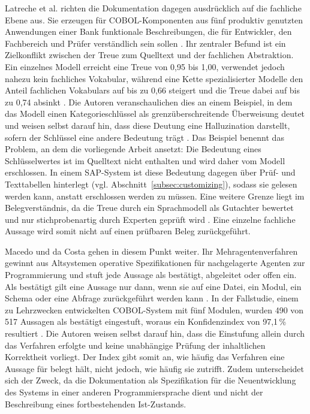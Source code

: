 Latreche et al. richten die Dokumentation dagegen ausdrücklich auf die fachliche Ebene aus. Sie erzeugen für COBOL-Komponenten aus fünf produktiv genutzten Anwendungen einer Bank funktionale Beschreibungen, die für Entwickler, den Fachbereich und Prüfer verständlich sein sollen \cite{latreche_llm-assisted_2026}. Ihr zentraler Befund ist ein Zielkonflikt zwischen der Treue zum Quelltext und der fachlichen Abstraktion. Ein einzelnes Modell erreicht eine Treue von 0,95 bis 1,00, verwendet jedoch nahezu kein fachliches Vokabular, während eine Kette spezialisierter Modelle den Anteil fachlichen Vokabulars auf bis zu 0,66 steigert und die Treue dabei auf bis zu 0,74 absinkt \cite{latreche_llm-assisted_2026}. Die Autoren veranschaulichen dies an einem Beispiel, in dem das Modell einen Kategorieschlüssel als grenzüberschreitende Überweisung deutet und weisen selbst darauf hin, dass diese Deutung eine Halluzination darstellt, sofern der Schlüssel eine andere Bedeutung trägt \cite{latreche_llm-assisted_2026}. Das Beispiel benennt das Problem, an dem die vorliegende Arbeit ansetzt: Die Bedeutung eines Schlüsselwertes ist im Quelltext nicht enthalten und wird daher vom Modell erschlossen. In einem SAP-System ist diese Bedeutung dagegen über Prüf- und Texttabellen hinterlegt (vgl. Abschnitt~\ref{subsec:customizing}), sodass sie gelesen werden kann, anstatt erschlossen werden zu müssen. Eine weitere Grenze liegt im Belegverständnis, da die Treue durch ein Sprachmodell als Gutachter bewertet und nur stichprobenartig durch Experten geprüft wird \cite{latreche_llm-assisted_2026}. Eine einzelne fachliche Aussage wird somit nicht auf einen prüfbaren Beleg zurückgeführt.

Macedo und da Costa gehen in diesem Punkt weiter. Ihr Mehragentenverfahren gewinnt aus Altsystemen operative Spezifikationen für nachgelagerte Agenten zur Programmierung und stuft jede Aussage als bestätigt, abgeleitet oder offen ein. Als bestätigt gilt eine Aussage nur dann, wenn sie auf eine Datei, ein Modul, ein Schema oder eine Abfrage zurückgeführt werden kann \cite{de_macedo_reversa_2026}. In der Fallstudie, einem zu Lehrzwecken entwickelten COBOL-System mit fünf Modulen, wurden 490 von 517 Aussagen als bestätigt eingestuft, woraus ein Konfidenzindex von 97,1\,\% resultiert \cite{de_macedo_reversa_2026}. Die Autoren weisen selbst darauf hin, dass die Einstufung allein durch das Verfahren erfolgte und keine unabhängige Prüfung der inhaltlichen Korrektheit vorliegt. Der Index gibt somit an, wie häufig das Verfahren eine Aussage für belegt hält, nicht jedoch, wie häufig sie zutrifft. Zudem unterscheidet sich der Zweck, da die Dokumentation als Spezifikation für die Neuentwicklung des Systems in einer anderen Programmiersprache dient und nicht der Beschreibung eines fortbestehenden Ist-Zustands.

